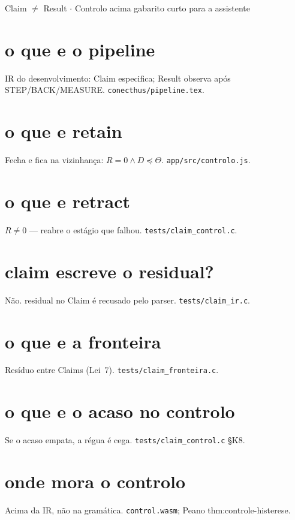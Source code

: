 \documentclass[11pt,a4paper]{article}
\newcommand{\code}[1]{\texttt{\small #1}}
\begin{document}
       {Claim $\neq$ Result $\cdot$ Controlo acima}
       {gabarito curto para a assistente}
\maketitle

\section*{o que e o pipeline}
IR do desenvolvimento: Claim especifica; Result observa após STEP/BACK/MEASURE.
\code{conecthus/pipeline.tex}.

\section*{o que e retain}
Fecha e fica na vizinhança: $R=0\wedge D\preceq\Theta$.
\code{app/src/controlo.js}.

\section*{o que e retract}
$R\neq0$ --- reabre o estágio que falhou.
\code{tests/claim\_control.c}.

\section*{claim escreve o residual?}
Não. residual no Claim é recusado pelo parser.
\code{tests/claim\_ir.c}.

\section*{o que e a fronteira}
Resíduo entre Claims (Lei~7). \code{tests/claim\_fronteira.c}.

\section*{o que e o acaso no controlo}
Se o acaso empata, a régua é cega. \code{tests/claim\_control.c} \S K8.

\section*{onde mora o controlo}
Acima da IR, não na gramática. \code{control.wasm}; Peano thm:controle-histerese.
\end{document}
